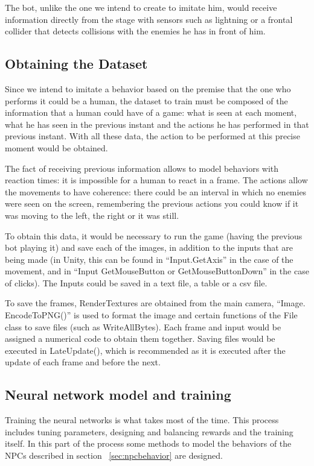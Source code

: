 The bot, unlike the one we intend to create to imitate him, would receive information directly from the stage with sensors such as lightning or a frontal collider that detects collisions with the enemies he has in front of him.

\subsection{Obtaining the Dataset}

Since we intend to imitate a behavior based on the premise that the one who performs it could be a human, the dataset to train must be composed of the information that a human could have of a game: what is seen at each moment, what he has seen in the previous instant and the actions he has performed in that previous instant. With all these data, the action to be performed at this precise moment would be obtained.

The fact of receiving previous information allows to model behaviors with reaction times: it is impossible for a human to react in a frame. The actions allow the movements to have coherence: there could be an interval in which no enemies were seen on the screen, remembering the previous actions you could know if it was moving to the left, the right or it was still.

To obtain this data, it would be necessary to run the game (having the previous bot playing it) and save each of the images, in addition to the inputs that are being made (in Unity, this can be found in “Input.GetAxis” in the case of the movement, and in “Input GetMouseButton or GetMouseButtonDown” in the case of clicks). The Inputs could be saved in a text file, a table or a csv file.

To save the frames, RenderTextures are obtained from the main camera, “Image. EncodeToPNG()” is used to format the image and certain functions of the File class to save files (such as WriteAllBytes). Each frame and input would be assigned a numerical code to obtain them together. Saving files would be executed in LateUpdate(), which is recommended as it is executed after the update of each frame and before the next.

\subsection{Neural network model and training}

Training the neural networks is what takes most of the time. This process includes tuning parameters, designing and balancing rewards and the training itself. In this part of the process some methods to model the behaviors of the NPCs described in section ~\ref{sec:npcbehavior} are designed.

